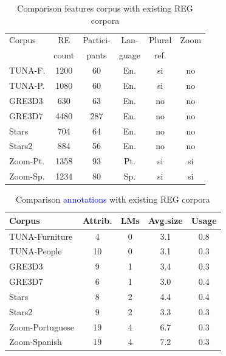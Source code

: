 \documentclass[11pt]{article}
\begin{document}
\begin{table}[ht]
\begin{center}
\footnotesize{
\caption{Comparison features corpus with existing REG corpora}
\label{tab-comparison-f}
\begin{tabular} {  l c c c c c}
\hline
Corpus			& RE    & Partici-& Lan-  & Plural & Zoom \\
						&count  &pants    & guage &ref.    &      \\
\hline
TUNA-F.			& 1200	& 60	&	En.	& si  & no \\
TUNA-P.			& 1080	& 60	& En.	& si  & no \\
GRE3D3			&	630		& 63	& En.	& no  & no \\
GRE3D7			&	4480	& 287	& En.	& no  & no \\
Stars				&	704		& 64	& En.	& no  & no \\
Stars2			& 884		& 56	& En.	& no  & no \\
Zoom-Pt.		& 1358	& 93	& Pt.	& si  & si \\
Zoom-Sp.		& 1234	& 80	& Sp.	& si  & si \\
\hline
\end{tabular}
}
\end{center}
\end{table}



\begin{table}[ht]
\begin{center}
\footnotesize{
\caption{Comparison \textcolor{blue}{annotations} with existing REG corpora}
\label{tab-comparison}
\begin{tabular} {  l c c c c}
\hline
Corpus											& Attrib.			& LMs			& Avg.size	& Usage \\
\hline
TUNA-Furniture							& 4								& 0							&	3.1				& 0.8   \\
TUNA-People									& 10							& 0							& 3.1				& 0.3   \\
GRE3D3											&	9								& 1							& 3.4				& 0.3   \\
GRE3D7											&	6								& 1							& 3.0				& 0.4   \\
Stars												&	8								& 2							& 4.4				& 0.4   \\
Stars2											& 9								& 2							& 3.3				& 0.3   \\
Zoom-Portuguese							& 19							& 4							& 6.7				& 0.3   \\
Zoom-Spanish								& 19							& 4							& 7.2				& 0.3   \\
\hline
\end{tabular}
}
\end{center}
\end{table}
\end{document}

